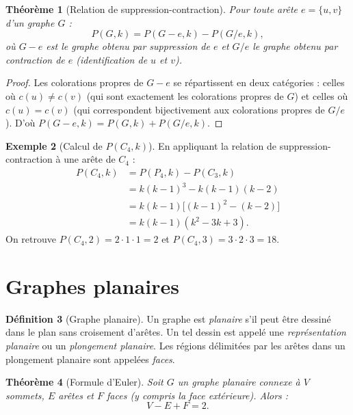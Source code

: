 \documentclass[12pt,a4paper,openany]{book}
\theoremstyle{definition}
\newtheorem{definition}{Définition}[chapter]
\newtheorem{exemple}[definition]{Exemple}
\theoremstyle{plain}
\newtheorem{theoreme}[definition]{Théorème}
\theoremstyle{remark}
\begin{document}
\begin{theoreme}[Relation de suppression-contraction]
\label{thm:suppression-contraction}
Pour toute arête $e = \{u,v\}$ d'un graphe $G$ :
\[
  P(G, k) = P(G - e, k) - P(G / e, k),
\]
où $G - e$ est le graphe obtenu par suppression de $e$ et $G / e$ le
graphe obtenu par contraction de $e$ (identification de $u$ et $v$).
\end{theoreme}

\begin{proof}
Les colorations propres de $G-e$ se répartissent en deux catégories :
celles où $c(u) \neq c(v)$ (qui sont exactement les colorations propres
de $G$) et celles où $c(u) = c(v)$ (qui correspondent bijectivement aux
colorations propres de $G/e$). D'où
$P(G-e, k) = P(G, k) + P(G/e, k)$.
\end{proof}

\begin{exemple}[Calcul de $P(C_4, k)$]
\label{ex:poly-chrom-C4}
En appliquant la relation de suppression-contraction à une arête de $C_4$ :
\begin{align*}
  P(C_4, k) &= P(P_4, k) - P(C_3, k) \\
    &= k(k-1)^3 - k(k-1)(k-2) \\
    &= k(k-1)\bigl[(k-1)^2 - (k-2)\bigr] \\
    &= k(k-1)(k^2 - 3k + 3).
\end{align*}
On retrouve $P(C_4, 2) = 2 \cdot 1 \cdot 1 = 2$ et
$P(C_4, 3) = 3 \cdot 2 \cdot 3 = 18$.
\end{exemple}

\section{Graphes planaires}
\label{sec:planaires}

\begin{definition}[Graphe planaire]
\label{def:planaire}
Un graphe est \emph{planaire} s'il peut être dessiné dans le plan sans
croisement d'arêtes. Un tel dessin est appelé une \emph{représentation
planaire} ou un \emph{plongement planaire}. Les régions délimitées par les
arêtes dans un plongement planaire sont appelées \emph{faces}.
\end{definition}

\begin{theoreme}[Formule d'Euler]
\label{thm:euler-formule}
Soit $G$ un graphe planaire connexe à $V$ sommets, $E$ arêtes et $F$
faces (y compris la face extérieure). Alors :
\[
  V - E + F = 2.
\]
\end{theoreme}
\end{document}
